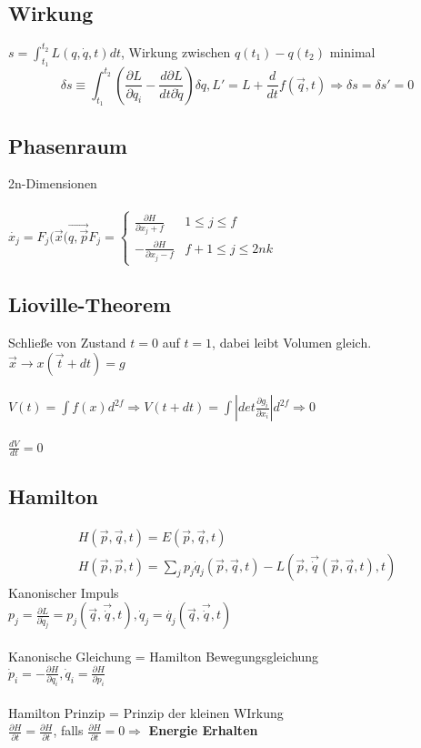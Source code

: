 \documentclass[10pt,a4paper]{article}
\begin{document}
%
\subsection{Wirkung}
$s = \int_{t_1}^{t_2}L(q,\dot{q},t)dt$, Wirkung zwischen $q(t_1)-q(t_2)$ minimal\\
%
\[
\delta s \equiv \int_{t_1}^{t_2} \left(\frac{\partial L}{\partial q_i}-\frac{d \partial L}{dt\partial \dot{q}}\right)\delta q, L'=L+\frac{d}{dt}f(\vec{q},t)\Rightarrow \delta s = \delta s'=0\]
%
\subsection{Phasenraum}
2n-Dimensionen\\
%
\\
$\dot{x_j}=F_j(\vec{x}(\vec{q,\vec{p}} F_j= \begin{cases}\frac{\partial H}{\partial x_j+f}& 1 \leq j \leq f \\ -\frac{\partial H}{\partial x_j-f} &f+1\leq j \leq 2nk \end{cases}$
% 
\subsection{Lioville-Theorem}
Schließe von Zustand $t= 0$ auf $t=1$, dabei leibt Volumen gleich. $\vec{x}\rightarrow x(\vec{t}+dt)=g$\\
%
\\
$V(t) = \int f(x)d^{2f} \Rightarrow V(t+dt)=\int |det\frac{\partial g_i}{\partial x_i}|d^{2f} \Rightarrow 0$\\
%
\\ 
$\frac{dV}{dt}=0$\\
%


\subsection{Hamilton}
\begin{eqnarray}
H(\vec{p},\vec{q},t)= E(\vec{p},\vec{q},t)\\
H(\vec{p},\vec{p},t) = \sum_j  p_j \dot{q}_j  (\vec{p},\vec{q},t)  - L(\vec{p},\vec{\dot{q}}(\vec{p},\vec{q},t),t)
\end{eqnarray}
%
Kanonischer Impuls\\
$p_{j} = {\frac{{\partial L}}{{\partial \dot q_j }}} = p_j(\vec{q},\vec{\dot q}, t), \dot{q}_j= \dot{q_j}(\vec{q},\vec{\dot{q}}, t)$\\
%
\\
Kanonische Gleichung = Hamilton Bewegungsgleichung\\
$\dot{p}_i = -\frac{\partial H}{\partial q_i}, \dot{q}_i = \frac{\partial H}{\partial p_i} $\\
\\
%
Hamilton Prinzip = Prinzip der kleinen WIrkung\\
$\frac{\partial H}{\partial t} = \frac{\partial H}{\partial t}$, falls $\frac{\partial H}{\partial t} = 0 \Rightarrow$ \textbf{Energie Erhalten}
%
\end{document}
